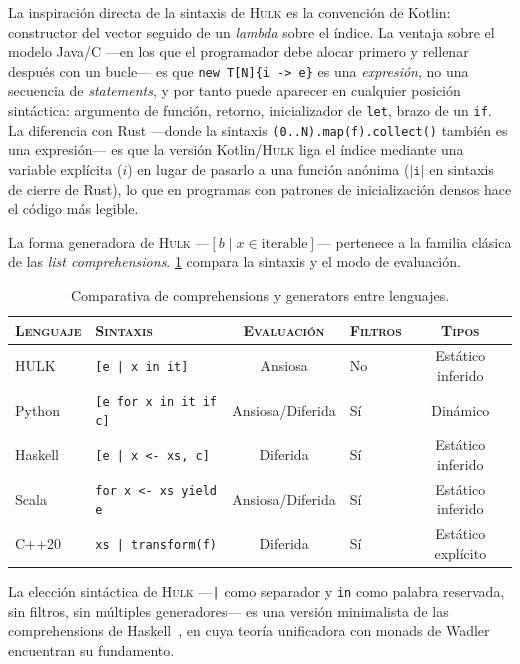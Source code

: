 \documentclass[11pt,a4paper,oneside,openany]{report}
\newcommand{\hulk}{\textsc{Hulk}}
\newcommand{\code}[1]{\texttt{#1}}
\begin{document}
La inspiración directa de la sintaxis de \hulk{} es la convención de
Kotlin: constructor del vector seguido de un \emph{lambda} sobre el
índice. La ventaja sobre el modelo Java/C ---en los que el programador
debe alocar primero y rellenar después con un bucle--- es que
\code{new T[N]\{i -> e\}} es una \emph{expresión}, no una secuencia de
\emph{statements}, y por tanto puede aparecer en cualquier posición
sintáctica: argumento de función, retorno, inicializador de \code{let},
brazo de un \code{if}. La diferencia con Rust ---donde la sintaxis
\code{(0..N).map(f).collect()} también es una expresión--- es que la
versión Kotlin/\hulk{} liga el índice mediante una variable explícita
($i$) en lugar de pasarlo a una función anónima ($\code{|i|}$ en sintaxis
de cierre de Rust), lo que en programas con patrones de inicialización
densos hace el código más legible.

La forma generadora de \hulk{} ---$[b \mid x \in \text{iterable}]$---
pertenece a la familia clásica de las \emph{list comprehensions}.
\cref{tab:vec-gen-lang} compara la sintaxis y el modo de evaluación.

\begin{table}[H]
\centering
\caption{Comparativa de comprehensions y generators entre lenguajes.}
\label{tab:vec-gen-lang}
\begin{tabularx}{\textwidth}{lXcXc}
\toprule
\textsc{Lenguaje} & \textsc{Sintaxis} & \textsc{Evaluación}
  & \textsc{Filtros} & \textsc{Tipos} \\
\midrule
HULK    & \code{[e | x in it]}            & Ansiosa     & No  & Estático inferido \\
Python  & \code{[e for x in it if c]}      & Ansiosa/Diferida & Sí  & Dinámico \\
Haskell & \code{[e | x <- xs, c]}          & Diferida    & Sí  & Estático inferido \\
Scala   & \code{for x <- xs yield e}       & Ansiosa/Diferida & Sí  & Estático inferido \\
C++20   & \code{xs | transform(f)}         & Diferida    & Sí  & Estático explícito \\
\bottomrule
\end{tabularx}
\end{table}

La elección sintáctica de \hulk{} ---\code{|} como separador y \code{in}
como palabra reservada, sin filtros, sin múltiples generadores--- es una
versión minimalista de las comprehensions de Haskell~\cite{peytonjones2003},
en cuya teoría unificadora con monads de Wadler~\cite{wadler1990}
encuentran su fundamento.
\end{document}
